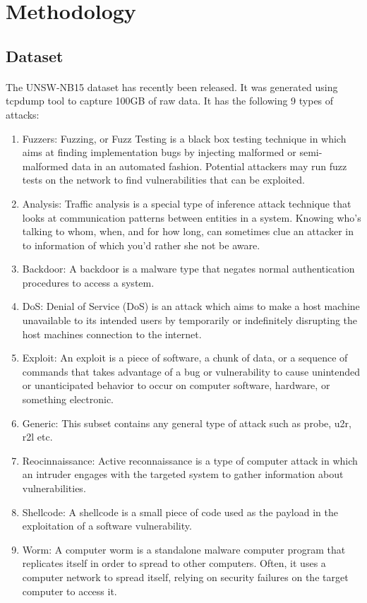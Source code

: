 \documentclass[a4paper,12pt]{article}
\begin{document}
	\section{Methodology}
        \subsection{Dataset}
            \paragraph{}
                The UNSW-NB15 dataset has recently been released. It was generated using tcpdump tool to capture 100GB of raw data. It has the following 9 types of attacks:
                \begin{enumerate}
                    \item Fuzzers: Fuzzing, or Fuzz Testing is a black box testing technique in which aims at finding implementation bugs by injecting malformed or semi-malformed data in an automated fashion. Potential attackers may run fuzz tests on the network to find vulnerabilities that can be exploited.
                    \item Analysis: Traffic analysis is a special type of inference attack technique that looks at communication patterns between entities in a system. Knowing who's talking to whom, when, and for how long, can sometimes clue an attacker in to information of which you'd rather she not be aware.
                    \item Backdoor: A backdoor is a malware type that negates normal authentication procedures to access a system.
                    \item DoS: Denial of Service (DoS) is an attack which aims to make a host machine unavailable to its intended users by temporarily or indefinitely disrupting the host machines connection to the internet.
                    \item Exploit: An exploit is a piece of software, a chunk of data, or a sequence of commands that takes advantage of a bug or vulnerability to cause unintended or unanticipated behavior to occur on computer software, hardware, or something electronic.
                    \item Generic: This subset contains any general type of attack such as probe, u2r, r2l etc.
                    \item Reocinnaissance: Active reconnaissance is a type of computer attack in which an intruder engages with the targeted system to gather information about vulnerabilities.
                    \item Shellcode: A shellcode is a small piece of code used as the payload in the exploitation of a software vulnerability.
                    \item Worm: A computer worm is a standalone malware computer program that replicates itself in order to spread to other computers. Often, it uses a computer network to spread itself, relying on security failures on the target computer to access it.
                \end{enumerate}
\end{document}
